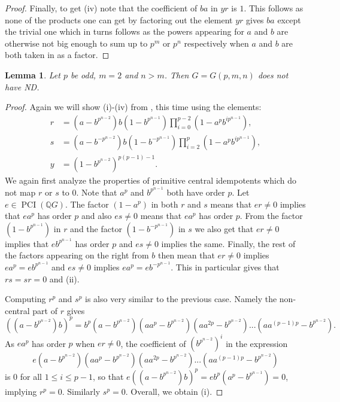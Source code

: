 \documentclass[a4paper,10pt]{amsart}
\newtheorem{lemma}{Lemma}[section]
\theoremstyle{definition}
\theoremstyle{remark}
\newcommand\PCI{\operatorname{PCI}}
\begin{document}
\begin{proof}
Finally, to get (iv) note that the coefficient of $ba$ in $yr$ is $1$. This follows as none of the products one can get by factoring out the element $yr$ gives $ba$ except the trivial one which in turns follows as the powers appearing for $a$ and $b$ are otherwise not big enough to sum up to $p^m$ or $p^n$ respectively when $a$ and $b$ are both taken in as a factor.
\end{proof}

\begin{lemma}\label{lem:GpmnOddCase2}
Let $p$ be odd, $m =2$ and $n > m$. Then $G = G(p,m,n)$ does not have ND. 
\end{lemma}
\begin{proof}
Again we will show (i)-(iv) from , this time using the elements:
\begin{align*}
r &= (a-b^{p^{n-2}})b(1-b^{p^{n-1}})\prod_{i=0}^{p-2}(1-a^pb^{ip^{n-1}}), \\
s &= (a-b^{-p^{n-2}})b(1-b^{-p^{n-1}})\prod_{i=2}^p(1-a^pb^{ip^{n-1}}), \\
y & = (1-b^{p^{n-2}})^{p(p-1)-1}.
\end{align*}
We again first analyze the properties of primitive central idempotents which do not map $r$ or $s$ to $0$. Note that $a^p$ and $b^{p^{n-1}}$ both have order $p$. Let $e \in \PCI(\mathbb{Q}G)$. The factor $(1-a^p)$ in both $r$ and $s$ means that $er \neq 0$ implies that $ea^p$ has order $p$ and also $es \neq 0$ means that $ea^p$ has order $p$. From the factor $(1-b^{p^{n-1}})$ in $r$ and the factor $(1-b^{-p^{n-1}})$ in $s$ we also get that $er \neq 0$ implies that $eb^{p^{n-1}}$ has order $p$ and $es \neq 0$ implies the same. Finally, the rest of the factors appearing on the right from $b$ then mean that $er \neq 0$ implies $ea^p = eb^{p^{n-1}}$ and $es \neq 0$ implies $ea^p = eb^{-p^{n-1}}$. This in particular gives that $rs = sr = 0$ and (ii).

Computing $r^p$ and $s^p$ is also very similar to the previous case. Namely the non-central part of $r$ gives
\[((a-b^{p^{n-2}})b)^p  = b^p(a-b^{p^{n-2}})(aa^p-b^{p^{n-2}})(aa^{2p}-b^{p^{n-2}})...(aa^{(p-1)p} - b^{p^{n-2}}).\]
As $ea^p$ has order $p$ when $er \neq 0$, the coefficient of $(b^{p^{n-2}})^i$ in the expression 
\[e(a-b^{p^{n-2}})(aa^p-b^{p^{n-2}})(aa^{2p}-b^{p^{n-2}})...(aa^{(p-1)p} - b^{p^{n-2}})\]
is $0$ for all $1 \leq i \leq p-1$, so that $e((a-b^{p^{n-2}})b)^p = eb^p(a^p - b^{p^{n-1}}) = 0$, implying $r^p = 0$. Similarly $s^p = 0$. Overall, we obtain (i).


\end{proof}
\end{document}
